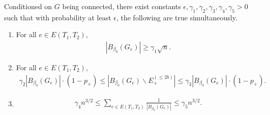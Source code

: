 \begin{corollary} \label{coro:conn:phase-2:step-c:structure-2}
  Conditioned on $G$ being connected, there exist constants $\epsilon,\gamma_1,\gamma_2,\gamma_3,\gamma_4,\gamma_5>0$ such that with probability at least $\epsilon$, the following are true simultaneously.
  \begin{enumerate}[label=(\roman*)]
    \item\label{item:coro:conn:phase-2:step-c:structure-2:i} For all $e\in E(T_1,T_2)$,
    \begin{align*}
      \left| B_{\beta_0}(G_e) \right| \ge \gamma_1 \sqrt n.
    \end{align*}
    \item\label{item:coro:conn:phase-2:step-c:structure-2:ii} For all $e\in E(T_1,T_2)$,
    \begin{align} \label{eqn:item:coro:conn:phase-2:step-c:structure-2:ii}
      \gamma_2 \left| B_{\beta_0}(G_e) \right| \cdot (1-p_+)\le \left| B_{\beta_0}(G_e) \backslash E^{(\le 2b)}_+ \right| \le \gamma_3 \left| B_{\beta_0}(G_e) \right| \cdot (1-p_+).
    \end{align}
    \item\label{item:coro:conn:phase-2:step-c:structure-2:iii}
    \begin{align*}
      \gamma_4 n^{3/2} \le \sum_{e\in E(T_1,T_2)} \frac 1{\left| B_{\beta_0}(G_e) \right|} \le \gamma_5 n^{3/2}.
    \end{align*}
  \end{enumerate}
\end{corollary}
